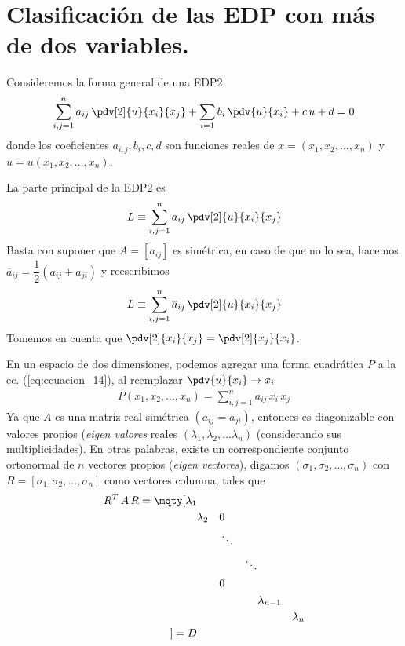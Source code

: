 \section{Clasificación de las EDP con más de dos variables.}
Consideremos la forma general de una EDP2
\begin{align}
\sum_{i,j=1}^{n} a_{ij} \, \pdv[2]{u}{x_{i}}{x_{j}} + \sum_{i=1} b_{i} \, \pdv{u}{x_{i}} + c \, u + d = 0
\label{eq:ecuacion_12}    
\end{align}
donde los coeficientes $a_{i,j}, b_{i}, c, d$ son funciones reales de $x = (x_{1}, x_{2}, \ldots, x_{n})$ y $u = u(x_{1}, x_{2}, \ldots, x_{n})$.
\par
La parte principal de la EDP2 es
\begin{align}
L \equiv \sum_{i, j=1}^{n} a_{ij} \, \pdv[2]{u}{x_{i}}{x_{j}}
\label{eq:ecuacion_13}    
\end{align}
Basta con suponer que $A = [a_{ij}]$ es simétrica, en caso de que no  lo sea, hacemos $\overline{a}_{ij} = \dfrac{1}{2} (a_{ij} + a_{ji})$ y reescribimos
\begin{align}
L \equiv \sum_{i, j=1}^{n} \overline{a}_{ij} \, \pdv[2]{u}{x_{i}}{x_{j}}
\label{eq:ecuacion_14}    
\end{align}
Tomemos en cuenta que $\displaystyle \pdv[2]{x_{i}}{x_{j}} = \pdv[2]{x_{j}}{x_{i}}$. 
\par
En un espacio de dos dimensiones, podemos agregar una forma cuadrática $P$ a la ec. (\ref{eq:ecuacion_14}), al reemplazar $\displaystyle \pdv{u}{x_{i}} \to x_{i}$
\begin{align}
P(x_{1}, x_{2},\ldots, x_{n}) = \sum_{i,j=1}^{n} a_{ij} \, x_{i} \, x_{j}
\label{eq:ecuacion_015}
\end{align}
Ya que $A$ es una matriz real simétrica $(a_{ij} = a_{ji})$, entonces es diagonizable con valores propios (\emph{eigen valores} reales $(\lambda_{1}, \lambda_{2}, \ldots \lambda_{n})$ (considerando sus multiplicidades). En otras palabras, existe un correspondiente conjunto ortonormal de $n$ vectores propios (\emph{eigen vectores}), digamos $(\sigma_{1}, \sigma_{2}, \ldots, \sigma_{n})$ con $R = [\sigma_{1}, \sigma_{2}, \ldots, \sigma_{n}]$ como vectores columna, tales que
\begin{align}
R^{T} \, A \, R =
\mqty[
\lambda_{1} & & & & & & \\
& \lambda_{2} & & 0 & & & \\
& & & \ddots & &  & \\
& & & &\ddots & & \\
& & & 0 & & & \\
&  & &  & & \lambda_{n-1} & \\
&  & &  & & & \lambda_{n} \\
] = D
\label{eq:ecuacion_16}    
\end{align}
